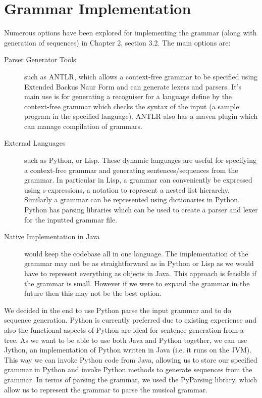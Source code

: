 \documentclass[pdftex,12pt,a4paper]{report}
\begin{document}
\section{Grammar Implementation}
Numerous options have been explored for implementing the grammar (along with generation of sequences) in Chapter 2, section 3.2. The main options are:

\begin{description}
  \item[Parser Generator Tools] such as ANTLR, which allows a context-free grammar to be specified using Extended Backus Naur Form and can generate lexers and parsers. It's main use is for generating a recogniser for a language define by the context-free grammar which checks the syntax of the input (a sample program in the specified language). ANTLR also has a maven plugin which can manage compilation of grammars.
  \item[External Languages] such as Python, or Lisp. These dynamic languages are useful for specifying a context-free grammar and generating sentences/sequences from the grammar. In particular in Lisp, a grammar can conveniently be expressed using s-expressions, a notation to represent a nested list hierarchy. Similarly a grammar can be represented using dictionaries in Python. Python has parsing libraries which can be used to create a parser and lexer for the inputted grammar file.
  \item[Native Implementation in Java] would keep the codebase all in one language. The implementation of the grammar may not be as straightforward as in Python or Lisp as we would have to represent everything as objects in Java. This approach is feasible if the grammar is small. However if we were to expand the grammar in the future then this may not be the best option.
\end{description}

We decided in the end to use Python parse the input grammar and to do sequence generation. Python is currently preferred due to existing experience and also the functional aspects of Python are ideal for sentence generation from a tree. As we want to be able to use both Java and Python together, we can use Jython, an implementation of Python written in Java (i.e. it runs on the JVM). This way we can invoke Python code from Java, allowing us to store our specified grammar in Python and invoke Python methods to generate sequences from the grammar. 
In terms of parsing the grammar, we used the PyParsing library, which allow us to represent the grammar to parse the musical grammar. 
\end{document}
